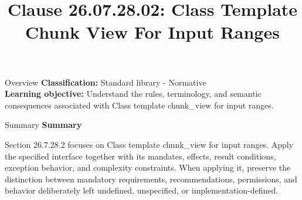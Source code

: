 \documentclass[10pt,letterpaper]{article}
\title{Clause 26.07.28.02: Class Template Chunk View For Input Ranges}
\author{}
\date{}
\begin{document}
\maketitle
\begin{CornellOverviewBox}{Overview}
\textbf{Classification:} Standard library - Normative\\[2pt]
\textbf{Learning objective:} Understand the rules, terminology, and semantic consequences associated with Class template chunk\_view for input ranges.
\end{CornellOverviewBox}\begin{CornellSummaryBox}{Summary}
{\sffamily\bfseries\color{Accent} Summary}\par\vspace{3pt}Section 26.7.28.2 focuses on Class template chunk\_view for input ranges. Apply the specified interface together with its mandates, effects, result conditions, exception behavior, and complexity constraints. When applying it, preserve the distinction between mandatory requirements, recommendations, permissions, and behavior deliberately left undefined, unspecified, or implementation-defined.
\end{CornellSummaryBox}
\end{document}
